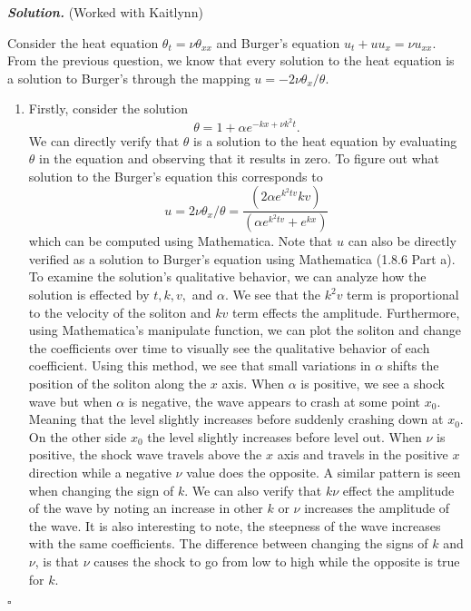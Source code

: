 \documentclass[12pt]{report}
\newenvironment{solution}[1][\it{Solution}]{\textbf{#1. } }{$\square$}
\begin{document}
\begin{solution}
    (Worked with Kaitlynn)

    \noindent
    Consider the heat equation $\theta_t = \nu \theta_{xx}$ and Burger's equation $u_t + uu_x = \nu u_{xx}$.
    From the previous question, we know that every solution to the heat equation is a solution to Burger's through the mapping $u = - 2 \nu \theta_x / \theta$.
    \begin{enumerate}
        \item Firstly, consider the solution $$\theta = 1 + \alpha e^{-kx+\nu k^2 t}.$$
        We can directly verify that $\theta$ is a solution to the heat equation by evaluating $\theta$ in the equation and observing that it results in zero.
        To figure out what solution to the Burger's equation this corresponds to
        $$u = 2 \nu \theta_x / \theta = \frac{(2 \alpha e^{k^2 t v} k v)}{(\alpha e^{k^2 t v} + e^{k x})}$$
        which can be computed using Mathematica. Note that $u$ can also be directly verified as a solution to Burger's equation using Mathematica (1.8.6 Part a).
        To examine the solution's qualitative behavior, we can analyze how the solution is effected by $t,k,v,$ and $\alpha$.
        We see that the $k^2v$ term is proportional to the velocity of the soliton and $kv$ term effects the amplitude.
        Furthermore, using Mathematica's manipulate function, we can plot the soliton and change the coefficients over time to visually see the qualitative behavior of each coefficient.
        Using this method, we see that small variations in $\alpha$ shifts the position of the soliton along the $x$ axis.
        When $\alpha$ is positive, we see a shock wave but when $\alpha$ is negative, the wave appears to crash at some point $x_0$. Meaning that the level slightly increases before suddenly crashing down at $x_0$. On the other side $x_0$ the level slightly increases before level out.
        When $\nu$ is positive, the shock wave travels above the $x$ axis and travels in the positive $x$ direction while a negative $\nu$ value does the opposite.
        A similar pattern is seen when changing the sign of $k$. We can also verify that $k\nu$ effect the amplitude of the wave by noting an increase in other $k$ or $\nu$ increases the amplitude of the wave. It is also interesting to note, the steepness of the wave increases with the same coefficients.
        The difference between changing the signs of $k$ and $\nu$, is that $\nu$ causes the shock to go from low to high while the opposite is true for $k$. 


\end{enumerate}
\end{solution}
\end{document}
